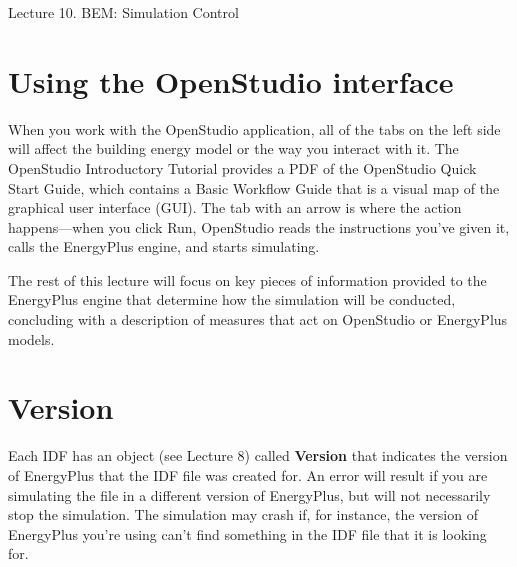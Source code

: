 \documentclass[10pt]{article}
\begin{document}
   \noindent
   \begin{center}

   \hrulefill
   
   \vspace{5pt}
   
   \vspace{0pt}
   
   {\Large \hfill  Lecture 10. BEM: Simulation Control}
   \vspace{5pt}
   
  
   \hrulefill
   \end{center}

{}


\section{Using the OpenStudio interface}

When you work with the OpenStudio application, all of the tabs on the left side will affect the building energy model or the way you interact with it.
The OpenStudio Introductory Tutorial \cite{noauthor_undated-fr} provides a PDF of the OpenStudio Quick Start Guide, which contains a Basic Workflow Guide that is a visual map of the graphical user interface (GUI).  The tab with an arrow is where the action happens---when you click Run, OpenStudio reads the instructions you've given it, calls the EnergyPlus engine, and starts simulating.

The rest of this lecture will focus on key pieces of information provided to the EnergyPlus engine that determine how the simulation will be conducted, concluding with a description of measures that act on OpenStudio or EnergyPlus models. 

\section{Version}

Each IDF has an object (see Lecture 8) called \textbf{Version} that indicates the version of EnergyPlus that the IDF file was created for. An error will result if you are simulating the file in a different version of EnergyPlus, but will not necessarily stop the simulation. The simulation may crash if, for instance, the version of EnergyPlus you're using can't find something in the IDF file that it is looking for.
\end{document}

